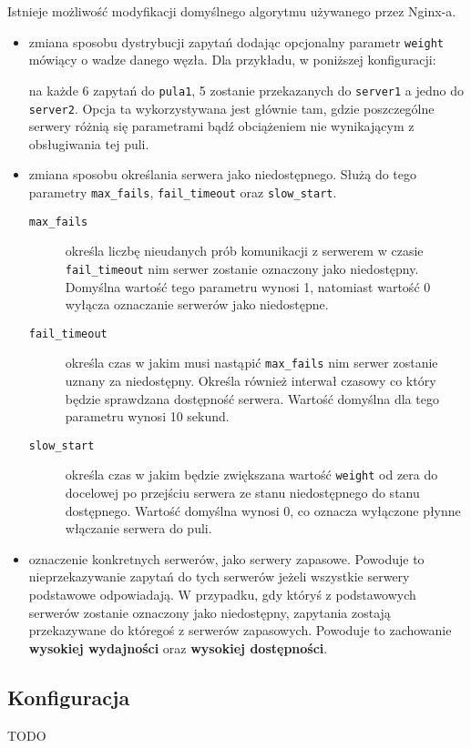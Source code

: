 {Istnieje możliwość modyfikacji domyślnego algorytmu używanego przez Nginx-a.
\begin{itemize}
	\item zmiana sposobu dystrybucji zapytań dodając opcjonalny parametr \texttt{weight} mówiący o wadze danego węzła. Dla przykładu, w poniższej konfiguracji:
	
	na każde 6 zapytań do \texttt{pula1}, 5 zostanie przekazanych do \texttt{server1} a jedno do \texttt{server2}.
	Opcja ta wykorzystywana jest głównie tam, gdzie poszczególne serwery różnią się parametrami bądź obciążeniem nie wynikającym z obsługiwania tej puli.
	\item zmiana sposobu określania serwera jako niedostępnego.
	Służą do tego parametry \texttt{max\_fails}, \texttt{fail\_timeout} oraz \texttt{slow\_start}.\\
	\begin{description}
	\item[\texttt{max\_fails}] określa liczbę nieudanych prób komunikacji z serwerem w czasie \texttt{fail\_timeout} nim serwer zostanie oznaczony jako niedostępny.
	Domyślna wartość tego parametru wynosi 1, natomiast wartość 0 wyłącza oznaczanie serwerów jako niedostępne.
	\item[\texttt{fail\_timeout}] określa czas w jakim musi nastąpić \texttt{max\_fails} nim serwer zostanie uznany za niedostępny.
	Określa również interwał czasowy co który będzie sprawdzana dostępność serwera.
	Wartość domyślna dla tego parametru wynosi 10 sekund.
	\item[\texttt{slow\_start}] określa czas w jakim będzie zwiększana wartość \texttt{weight} od zera do docelowej po przejściu serwera ze stanu niedostępnego do stanu dostępnego.
	Wartość domyślna wynosi 0, co oznacza wyłączone płynne włączanie serwera do puli.
	\end{description}
	\item oznaczenie konkretnych serwerów, jako serwery zapasowe.  
	Powoduje to nieprzekazywanie zapytań do tych serwerów jeżeli wszystkie serwery podstawowe odpowiadają.
	W przypadku, gdy któryś z podstawowych serwerów zostanie oznaczony jako niedostępny, zapytania zostają przekazywane do któregoś z serwerów zapasowych.
	Powoduje to zachowanie \textbf{wysokiej wydajności} oraz \textbf{wysokiej dostępności}.	
\end{itemize}
\subsection{Konfiguracja}
TODO
}
